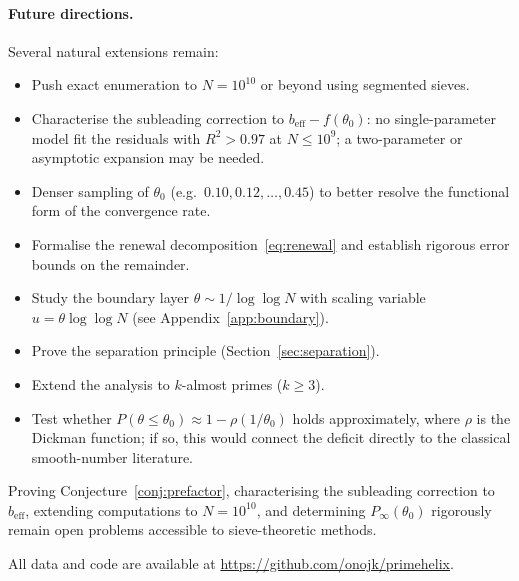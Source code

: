 \documentclass[11pt]{article}
\theoremstyle{definition}
\begin{document}
\paragraph{Future directions.}
Several natural extensions remain:
\begin{itemize}
  \item Push exact enumeration to \(N = 10^{10}\) or beyond using segmented sieves.
  \item Characterise the subleading correction to \(b_{\mathrm{eff}} - f(\theta_0)\):
        no single-parameter model fit the residuals with \(R^2 > 0.97\) at
        \(N \leq 10^9\); a two-parameter or asymptotic expansion may be needed.
  \item Denser sampling of \(\theta_0\) (e.g.\ \(0.10, 0.12, \ldots, 0.45\)) to better
        resolve the functional form of the convergence rate.
  \item Formalise the renewal decomposition~\eqref{eq:renewal} and establish rigorous
        error bounds on the remainder.
  \item Study the boundary layer \(\theta \sim 1/\log\log N\) with scaling variable
        \(u = \theta \log\log N\) (see Appendix~\ref{app:boundary}).
  \item Prove the separation principle (Section~\ref{sec:separation}).
  \item Extend the analysis to \(k\)-almost primes (\(k \ge 3\)).
  \item Test whether \(P(\theta \le \theta_0) \approx 1 - \rho(1/\theta_0)\)
        holds approximately, where \(\rho\) is the Dickman function; if so,
        this would connect the deficit directly to the classical smooth-number
        literature.
\end{itemize}

Proving Conjecture~\ref{conj:prefactor}, characterising the subleading correction
to \(b_{\mathrm{eff}}\), extending computations to \(N = 10^{10}\), and
determining \(P_\infty(\theta_0)\) rigorously remain open problems accessible to
sieve-theoretic methods.

All data and code are available at \url{https://github.com/onojk/primehelix}.

\end{document}
